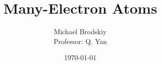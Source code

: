 


\title{Many-Electron Atoms}
\date{\today}
\author{Michael Brodskiy\\ \small Professor: Q. Yan}



\maketitle

\newpage

\tableofcontents

\newpage

